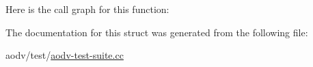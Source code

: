 Here is the call graph for this function\+:




The documentation for this struct was generated from the following file\+:\begin{DoxyCompactItemize}
\item 
aodv/test/\hyperlink{aodv-test-suite_8cc}{aodv-\/test-\/suite.\+cc}\end{DoxyCompactItemize}
